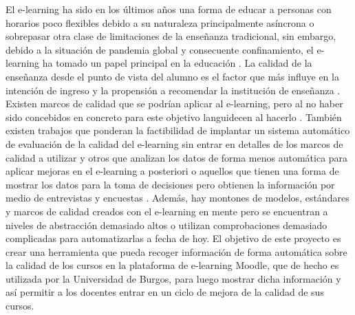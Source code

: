 
El e-learning ha sido en los últimos años una forma de educar a personas con horarios poco flexibles debido a su naturaleza principalmente asíncrona o sobrepasar otra clase de limitaciones de la enseñanza tradicional, sin embargo, debido a la situación de pandemia global y consecuente confinamiento, el e-learning ha tomado un papel principal en la educación \cite{muhammad2020hierarchical}.
La calidad de la enseñanza desde el punto de vista del alumno es el factor que más influye en la intención de ingreso y la propensión a recomendar la institución de enseñanza \cite{martinez2016perceived}.
Existen marcos de calidad que se podrían aplicar al e-learning, pero al no haber sido concebidos en concreto para este objetivo languidecen al hacerlo \cite{muhammad2020hierarchical}.
También existen trabajos que ponderan la factibilidad de implantar un sistema automático de evaluación de la calidad del e-learning sin entrar en detalles de los marcos de calidad a utilizar \cite{doneva2015automated} y otros que analizan los datos de forma menos automática para aplicar mejoras en el e-learning a posteriori \cite{ueda2017data} o aquellos que tienen una forma de mostrar los datos para la toma de decisiones pero obtienen la información por medio de entrevistas y encuestas \cite{mejia2020dashboard}.
Además, hay montones de modelos, estándares y marcos de calidad creados con el e-learning en mente pero se encuentran a niveles de abstracción demasiado altos o utilizan comprobaciones demasiado complicadas para automatizarlas a fecha de hoy.
El objetivo de este proyecto es crear una herramienta que pueda recoger información de forma automática sobre la calidad de los cursos en la plataforma de e-learning Moodle, que de hecho es utilizada por la Universidad de Burgos, para luego mostrar dicha información y así permitir a los docentes entrar en un ciclo de mejora de la calidad de sus cursos.
